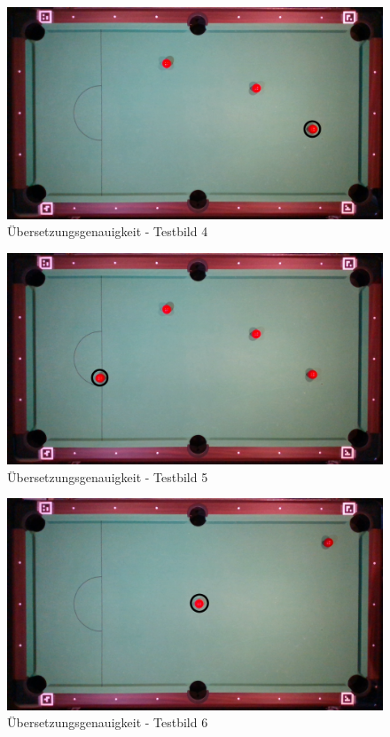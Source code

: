 \begin{figure}[h!]
    \begin{center}
        \includegraphics[width=0.8\linewidth]{../common/07_appendix/resources/01_translation/03_translation_testbild_4.png}
    \end{center}
    \caption{Übersetzungsgenauigkeit - Testbild 4}
    \label{fig:uebersetzungsgenauigkeit:testbild:4}
\end{figure}
\begin{figure}[h!]
    \begin{center}
        \includegraphics[width=0.8\linewidth]{../common/07_appendix/resources/01_translation/04_translation_testbild_5.png}
    \end{center}
    \caption{Übersetzungsgenauigkeit - Testbild 5}
    \label{fig:uebersetzungsgenauigkeit:testbild:5}
\end{figure}
\begin{figure}[h!]
    \begin{center}
        \includegraphics[width=0.8\linewidth]{../common/07_appendix/resources/01_translation/05_translation_testbild_6.png}
    \end{center}
    \caption{Übersetzungsgenauigkeit - Testbild 6}
    \label{fig:uebersetzungsgenauigkeit:testbild:6}
\end{figure}
